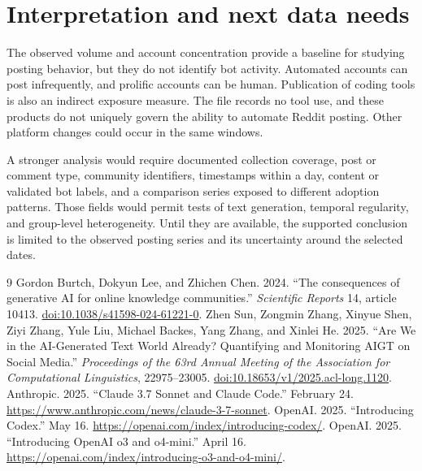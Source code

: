 \documentclass[11pt]{article}
\begin{document}
\section{Interpretation and next data needs}
The observed volume and account concentration provide a baseline for studying posting behavior, but they do not identify bot activity. Automated accounts can post infrequently, and prolific accounts can be human. Publication of coding tools is also an indirect exposure measure. The file records no tool use, and these products do not uniquely govern the ability to automate Reddit posting. Other platform changes could occur in the same windows.

A stronger analysis would require documented collection coverage, post or comment type, community identifiers, timestamps within a day, content or validated bot labels, and a comparison series exposed to different adoption patterns. Those fields would permit tests of text generation, temporal regularity, and group-level heterogeneity. Until they are available, the supported conclusion is limited to the observed posting series and its uncertainty around the selected dates.

\begin{thebibliography}{9}
 Gordon Burtch, Dokyun Lee, and Zhichen Chen. 2024. ``The consequences of generative AI for online knowledge communities.'' \emph{Scientific Reports} 14, article 10413. \href{https://doi.org/10.1038/s41598-024-61221-0}{doi:10.1038/s41598-024-61221-0}.
 Zhen Sun, Zongmin Zhang, Xinyue Shen, Ziyi Zhang, Yule Liu, Michael Backes, Yang Zhang, and Xinlei He. 2025. ``Are We in the AI-Generated Text World Already? Quantifying and Monitoring AIGT on Social Media.'' \emph{Proceedings of the 63rd Annual Meeting of the Association for Computational Linguistics}, 22975--23005. \href{https://doi.org/10.18653/v1/2025.acl-long.1120}{doi:10.18653/v1/2025.acl-long.1120}.
 Anthropic. 2025. ``Claude 3.7 Sonnet and Claude Code.'' February 24. \url{https://www.anthropic.com/news/claude-3-7-sonnet}.
 OpenAI. 2025. ``Introducing Codex.'' May 16. \url{https://openai.com/index/introducing-codex/}.
 OpenAI. 2025. ``Introducing OpenAI o3 and o4-mini.'' April 16. \url{https://openai.com/index/introducing-o3-and-o4-mini/}.
\end{thebibliography}
\end{document}
